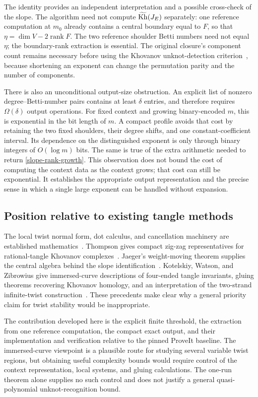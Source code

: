 The identity provides an independent interpretation and a possible
cross-check of the slope. The algorithm need not compute $\widetilde{\operatorname{Kh}}(J_E)$
separately: one reference computation at $m_0$ already contains a central
boundary equal to $F$, so that $\eta=\dim V-2\operatorname{rank}F$.
The two reference shoulder Betti numbers need not equal $\eta$; the
boundary-rank extraction is essential. The original closure's component
count remains necessary before using the Khovanov unknot-detection
criterion~\cite{km}, because shortening an exponent can change the
permutation parity and the number of components.

There is also an unconditional output-size obstruction. An explicit list
of nonzero degree--Betti-number pairs contains at least $\delta$ entries,
and therefore requires $\Omega(\delta)$ output operations. For fixed
context and growing binary-encoded $m$, this is exponential in the bit
length of $m$. A compact profile avoids that cost by retaining the two
fixed shoulders, their degree shifts, and one constant-coefficient
interval. Its dependence on the distinguished exponent is only through
binary integers of $O(\log m)$ bits. The same is true of the extra
arithmetic needed to return \eqref{slope-rank-growth}. This observation
does not bound the cost of computing the context data as the context
grows; that cost can still be exponential. It establishes the appropriate
output representation and the precise sense in which a single large
exponent can be handled without expansion.

\subsection{Position relative to existing tangle methods}

The local twist normal form, dot calculus, and cancellation machinery are
established mathematics~\cite{bn05,bn07}. Thompson gives compact zig-zag
representatives for rational-tangle Khovanov complexes~\cite{thompson}.
Jaeger's weight-moving theorem supplies the central algebra behind the
slope identification~\cite{jaeger}. Kotelskiy, Watson, and Zibrowius give
immersed-curve descriptions of four-ended tangle invariants, gluing
theorems recovering Khovanov homology, and an interpretation of the
two-strand infinite-twist construction~\cite{kwz}. These precedents make
clear why a general priority claim for twist stability would be
inappropriate.

The contribution developed here is the explicit finite threshold, the
extraction from one reference computation, the compact exact output, and
their implementation and verification relative to the pinned ProveIt
baseline. The immersed-curve viewpoint is a plausible route for studying
several variable twist regions, but obtaining useful complexity bounds
would require control of the context representation, local systems, and
gluing calculations. The one-run theorem alone supplies no such control
and does not justify a general quasi-polynomial unknot-recognition bound.
